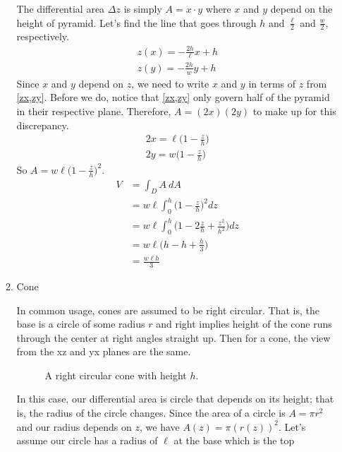 \begin{enumerate}
\begin{enumerate}[label = (\alph*), ref = \theenumi{(\alph*)}]
\begin{figure}[H]
    \end{figure}
    The differential area \(\Delta z\) is simply \(A = x\cdot y\) where \(x\)
    and \(y\) depend on the height of pyramid.
    Let's find the line that goes through \(h\) and \(\frac{\ell}{2}\) and
    \(\frac{w}{2}\), respectively.
    \begin{gather}
      z(x) = -\frac{2h}{\ell}x + h\label{zx}\\
      z(y) = -\frac{2h}{w}y + h\label{zy}
    \end{gather}
    Since \(x\) and \(y\) depend on \(z\), we need to write \(x\) and \(y\) in
    terms of \(z\) from \cref{zx,zy}.
    Before we do, notice that \cref{zx,zy} only govern half of the pyramid in
    their respective plane.
    Therefore, \(A = (2x)(2y)\) to make up for this discrepancy.
    \begin{gather*}
      2x = \ell\bigg(1 - \frac{z}{h}\bigg)\\
      2y = w\bigg(1 - \frac{z}{h}\bigg)
    \end{gather*}
    So \(A = w\ell\big(1 - \frac{z}{h}\big)^2\).
    \begin{align*}
      V &= \int_DA \ dA\\
        &= w\ell\int_0^h\bigg(1 - \frac{z}{h}\bigg)^2dz\\
        &= w\ell\int_0^h \bigg(1 - 2\frac{z}{h} + \frac{z^2}{h^2}\bigg)dz\\
        &= w\ell\bigg(h - h + \frac{h}{3}\bigg)\\
        &= \frac{w\ell h}{3}
    \end{align*}
  \item
    \label{15d}
    Cone
    \par\smallskip
    In common usage, cones are assumed to be right circular.
    That is, the base is a circle of some radius \(r\) and right implies height
    of the cone runs through the center at right angles straight up.
    Then for a cone, the view from the xz and yx planes are the same.
    \begin{figure}[H]
      \centering
      
      \caption{A right circular cone with height \(h\).}
    \end{figure}
    In this case, our differential area is circle that depends on its height;
    that is, the radius of the circle changes.
    Since the area of a circle is \(A = \pi r^2\) and our radius depends on
    \(z\), we have \(A(z) = \pi (r(z))^2\).
    Let's assume our circle has a radius of \(\ell\) at the base which is the top

\end{enumerate}
\end{enumerate}
